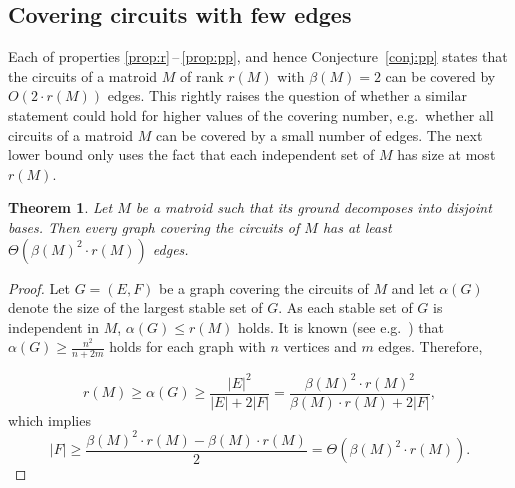 \documentclass[11pt,a4paper]{article}
\theoremstyle{plain}
\newtheorem{thm}{Theorem}
\theoremstyle{definition}
\newtheorem{rem}[thm]{Remark}
\newcommand{\tnote}[1]{{\color{blue}[{\tiny \textbf{Tamás:} \bf #1}]\marginpar{\color{blue}*}}}
\newcommand{\tnote}[1]{}
\begin{document}



\subsection{Covering circuits with few edges} \label{sec:few}

Each of properties \ref{prop:r}\,--\,\ref{prop:pp}, and hence Conjecture~\ref{conj:pp} states that the circuits of a matroid $M$ of rank $r(M)$ with $\beta(M)=2$ can be covered by $O\left(2\cdot r(M)\right)$ edges. This rightly raises the question of whether a similar statement could hold for higher values of the covering number, e.g.\  whether all circuits of a matroid $M$ can be covered by a small number of edges. The next lower bound only uses the fact that each independent set of $M$ has size at most $r(M)$.

\begin{thm} \label{thm:lower}
Let $M$ be a matroid such that its ground decomposes into disjoint bases. Then every graph covering the circuits of $M$ has at least $\Theta\left(\beta(M)^2 \cdot  r(M)\right)$ edges.
\end{thm}
\begin{proof}
Let $G=(E,F)$ be a graph covering the circuits of $M$ and let $\alpha(G)$ denote the size of the largest stable set of $G$. As each stable set of $G$ is independent in $M$, $\alpha(G) \le r(M)$ holds. It is known (see e.g.\ \cite[Theorem 13.5]{berge1970graphes}) 
that $\alpha(G) \ge \frac{n^2}{n+2m}$ holds for each graph with $n$ vertices and $m$ edges. Therefore, 

\[r(M) \ge \alpha(G) \ge \frac{|E|^2}{|E| + 2|F|} = \frac{\beta(M)^2 \cdot r(M)^2}{\beta(M) \cdot r(M) + 2 |F|},\]
which implies
\[|F| \ge \frac{\beta(M)^2 \cdot r(M)  - \beta(M) \cdot r(M)}{2} = \Theta\left(\beta(M)^2 \cdot r(M)\right).\]
\end{proof}
\end{document}
